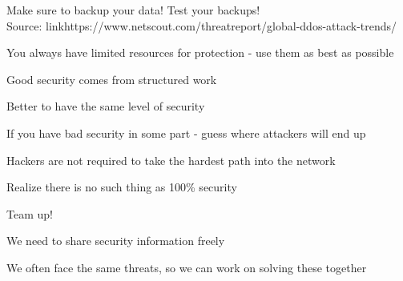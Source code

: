 \documentclass[Screen16to9,17pt]{foils}
\begin{document}

Make sure to backup your data! Test your backups!\\
Source: link{https://www.netscout.com/threatreport/global-ddos-attack-trends/}



\begin{list1}
\item You always have limited resources for protection - use them as best as possible
\item Good security comes from structured work
\end{list1}




\begin{list1}
\item Better to have the same level of security
\item If you have bad security in some part - guess where attackers will end up
\item Hackers are not required to take the hardest path into the network
\item Realize there is no such thing as 100\% security
\end{list1}





\begin{list1}
\item Team up!
\item We need to share security information freely
\item We often face the same threats, so we can work on solving these together
\end{list1}

\end{document}

